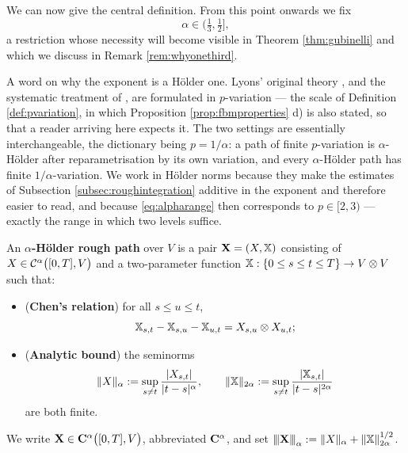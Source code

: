 We can now give the central definition. From this point onwards we fix
\begin{equation}\label{eq:alpharange}
\alpha \in \bigl(\tfrac13, \tfrac12\bigr],
\end{equation}
a restriction whose necessity will become visible in Theorem \ref{thm:gubinelli} and which we
discuss in Remark \ref{rem:whyonethird}.

A word on why the exponent is a Hölder one. Lyons' original theory \cite{lyons1998}, and the
systematic treatment of \cite{frizvictoir2010}, are formulated in $p$-variation --- the scale of
Definition \ref{def:pvariation}, in which Proposition \ref{prop:fbmproperties} d) is also stated, so that a reader arriving here expects it. The two
settings are essentially interchangeable, the dictionary being $p = 1/\alpha$: a path of finite
$p$-variation is $\alpha$-Hölder after reparametrisation by its own variation, and every
$\alpha$-Hölder path has finite $1/\alpha$-variation. We work in Hölder norms because they make the
estimates of Subsection \ref{subsec:roughintegration} additive in the exponent and therefore easier
to read, and because \eqref{eq:alpharange} then corresponds to $p \in [2,3)$ --- exactly the range
in which two levels suffice.

\begin{definition}\label{def:roughpath}
An \textbf{$\alpha$-Hölder rough path} over $V$ is a pair $\mathbf{X} = (X,\mathbb{X})$ consisting of
$X \in \mathcal{C}^{\alpha}\bigl([0,T],V\bigr)$ and a two-parameter function
$\mathbb{X} : \{0\leq s\leq t\leq T\} \to V\otimes V$ such that:
\begin{itemize}
    \item[i)] (\textbf{Chen's relation}) for all $s\leq u\leq t$,
    \begin{equation}\label{eq:chenaxiom}
    \mathbb{X}_{s,t} - \mathbb{X}_{s,u} - \mathbb{X}_{u,t} = X_{s,u}\otimes X_{u,t};
    \end{equation}
    \item[ii)] (\textbf{Analytic bound}) the seminorms
    \begin{equation}\label{eq:rpnorms}
    \lVert X\rVert_{\alpha} := \sup_{s\neq t}\frac{|X_{s,t}|}{|t-s|^{\alpha}}, \qquad
    \lVert \mathbb{X}\rVert_{2\alpha} := \sup_{s\neq t}\frac{|\mathbb{X}_{s,t}|}{|t-s|^{2\alpha}}
    \end{equation}
    are both finite.
\end{itemize}
We write $\mathbf{X} \in \mathbf{C}^{\alpha}\bigl([0,T],V\bigr)$, abbreviated $\mathbf{C}^{\alpha}$, and set
${\left\vert\kern-0.25ex\left\vert\kern-0.25ex\left\vert \mathbf{X} \right\vert\kern-0.25ex\right\vert\kern-0.25ex\right\vert}_{\alpha} := \lVert X\rVert_\alpha + \lVert\mathbb{X}\rVert_{2\alpha}^{1/2}$.
\end{definition}

